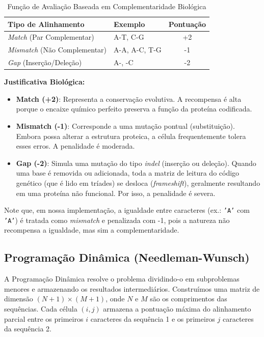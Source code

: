 \documentclass[12pt]{article}
\begin{document}
\begin{table}[!htb]
\centering
\caption{Função de Avaliação Baseada em Complementaridade Biológica}
\label{tab:tabela_pontuacao}
\begin{tabular}{@{}llc@{}}
\toprule
\textbf{Tipo de Alinhamento} & \textbf{Exemplo} & \textbf{Pontuação} \\ \midrule
\textit{Match} (Par Complementar)       & A-T, C-G         & +2 \\
\textit{Mismatch} (Não Complementar)    & A-A, A-C, T-G    & -1 \\
\textit{Gap} (Inserção/Deleção)         & A-, -C           & -2 \\ \bottomrule
\end{tabular}
\end{table}

\textbf{Justificativa Biológica:}
\begin{itemize}
    \item \textbf{Match (+2)}: Representa a conservação evolutiva. A recompensa é alta porque o encaixe químico perfeito preserva a função da proteína codificada.
    \item \textbf{Mismatch (-1)}: Corresponde a uma mutação pontual (substituição). Embora possa alterar a estrutura proteica, a célula frequentemente tolera esses erros. A penalidade é moderada.
    \item \textbf{Gap (-2)}: Simula uma mutação do tipo \textit{indel} (inserção ou deleção). Quando uma base é removida ou adicionada, toda a matriz de leitura do código genético (que é lido em tríades) se desloca (\textit{frameshift}), geralmente resultando em uma proteína não funcional. Por isso, a penalidade é severa.
\end{itemize}

Note que, em nossa implementação, a igualdade entre caracteres (ex.: \texttt{'A'} com \texttt{'A'}) é tratada como \textit{mismatch} e penalizada com -1, pois a natureza não recompensa a igualdade, mas sim a complementaridade.

\subsection{Programação Dinâmica (Needleman-Wunsch)}
\label{subsec:pd}

A Programação Dinâmica resolve o problema dividindo-o em subproblemas menores e armazenando os resultados intermediários. Construímos uma matriz de dimensão $(N+1) \times (M+1)$, onde $N$ e $M$ são os comprimentos das sequências. Cada célula $(i,j)$ armazena a pontuação máxima do alinhamento parcial entre os primeiros $i$ caracteres da sequência 1 e os primeiros $j$ caracteres da sequência 2.
\end{document}
